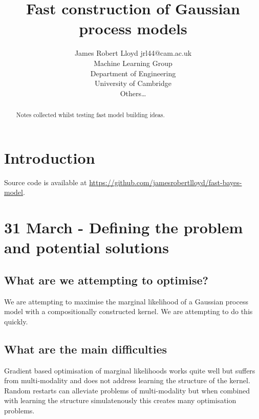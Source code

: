\documentclass[twoside,11pt]{article}
\begin{document}
\lstset{language=Lisp,basicstyle=\ttfamily\footnotesize} 

\title{Fast construction of Gaussian process models}

\author{\name James Robert Lloyd \email jrl44@cam.ac.uk \\
       \addr 
       Machine Learning Group \\
       Department of Engineering\\
       University of Cambridge\\
       \AND
       \name Others\dots}


\maketitle

\begin{abstract}
Notes collected whilst testing fast model building ideas.
\end{abstract}


\section{Introduction}

Source code is available at \url{https://github.com/jamesrobertlloyd/fast-bayes-model}.

\section{31 March - Defining the problem and potential solutions}

\subsection{What are we attempting to optimise?}

We are attempting to maximise the marginal likelihood of a Gaussian process model with a compositionally constructed kernel.
We are attempting to do this quickly.

\subsection{What are the main difficulties}

Gradient based optimisation of marginal likelihoods works quite well but suffers from multi-modality and does not address learning the structure of the kernel.
Random restarts can alleviate problems of multi-modality but when combined with learning the structure simulatenously this creates many optimisation problems.
\end{document}

